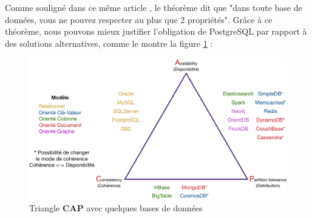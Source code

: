 Comme souligné dans ce même article \cite{acid_cap}, le théorème dit que "dans toute base de données, vous ne pouvez respecter au plus que 2 propriétés".
Grâce à ce théorème, nous pouvons mieux justifier l'obligation de PostgreSQL par rapport à des solutions alternatives, comme le montre la figure \ref{pic:capTriangleWithSomeDatabases} :

\begin{figure}[H]
    \includegraphics[width=\textwidth,height=\textheight,keepaspectratio]{images/triangleCAP_with_databases.png}
    \centering
    \caption[Triangle \textbf{CAP} avec quelques bases de données]{Triangle \textbf{CAP} avec quelques bases de données \cite{acid_cap}}
    \label{pic:capTriangleWithSomeDatabases}
\end{figure}